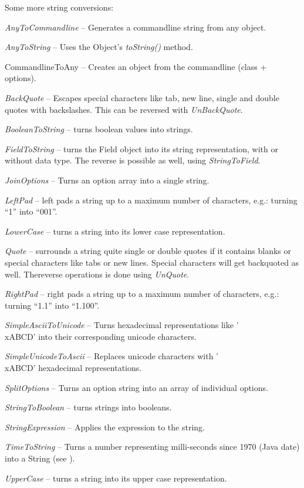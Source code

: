 Some more string conversions:
\begin{tight_itemize}
	\item \textit{AnyToCommandline} -- Generates a commandline string from any
	object.
	\item \textit{AnyToString} -- Uses the Object's \textit{toString()} method.
	\item CommandlineToAny -- Creates an object from the commandline (class +
	options).
	\item \textit{BackQuote} -- Escapes special characters like tab, new line,
	single and double quotes with backslashes. This can be reversed with
	\textit{UnBackQuote}.
	\item \textit{BooleanToString} -- turns boolean values into strings.
	\item \textit{FieldToString} -- turns the Field object into its string
	representation, with or without data type. The reverse is possible as well,
	using \textit{StringToField}.
	\item \textit{JoinOptions} -- Turns an option array into a single string.
	\item \textit{LeftPad} -- left pads a string up to a maximum number of
	characters, e.g.: turning ``1'' into ``001''.
	\item \textit{LowerCase} -- turns a string into its lower case representation.
	\item \textit{Quote} -- surrounds a string quite single or double quotes
	if it contains blanks or special characters like tabs or new lines. Special
	characters will get backquoted as well. Thereverse operations is done
	using \textit{UnQuote}.
	\item \textit{RightPad} -- right pads a string up to a maximum number of
	characters, e.g.: turning ``1.1'' into ``1.100''.
	\item \textit{SimpleAsciiToUnicode} -- Turns hexadecimal representations
	like '\\xABCD' into their corresponding unicode characters.
	\item \textit{SimpleUnicodeToAscii} -- Replaces unicode characters with
	'\\xABCD' hexadecimal representations.
	\item \textit{SplitOptions} -- Turns an option string into an array of individual options.
	\item \textit{StringToBoolean} -- turns strings into booleans.
	\item \textit{StringExpression} -- Applies the expression to the string.
	\item \textit{TimeToString} -- Turns a number representing milli-seconds since
	1970 (Java date) into a String (see \cite{dateformat}).
	\item \textit{UpperCase} -- turns a string into its upper case representation.
\end{tight_itemize}
